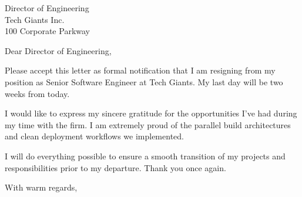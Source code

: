 \documentclass[11pt,a4paper]{letter}
\begin{document}
\begin{letter}{Director of Engineering \\ Tech Giants Inc. \\ 100 Corporate Parkway}

\opening{Dear Director of Engineering,}

Please accept this letter as formal notification that I am resigning from my position as Senior Software Engineer at Tech Giants. My last day will be two weeks from today.

I would like to express my sincere gratitude for the opportunities I've had during my time with the firm. I am extremely proud of the parallel build architectures and clean deployment workflows we implemented.

I will do everything possible to ensure a smooth transition of my projects and responsibilities prior to my departure. Thank you once again.

\closing{With warm regards,}
\end{letter}
\end{document}
